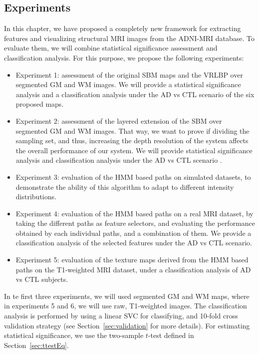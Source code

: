 \subsection{Experiments}
In this chapter, we have proposed a completely new framework for extracting features and visualizing structural \ac{MRI} images from the ADNI-MRI database. To evaluate them, we will combine statistical significance assessment and classification analysis. For this purpose, we propose the following experiments: 
\begin{itemize}
	\item Experiment 1: assessment of the original \ac{SBM} maps and the \ac{VRLBP} over segmented \ac{GM} and \ac{WM} images. We will provide a statistical significance analysis and a classification analysis under the \ac{AD} vs \ac{CTL} scenario of the six proposed maps. 
	\item Experiment 2: assessment of the layered extension of the \ac{SBM} over segmented \ac{GM} and \ac{WM} images. That way, we want to prove if dividing the sampling set, and thus, increasing the depth resolution of the system affects the overall performance of our system. We will provide statistical significance analysis and classification analysis under the \ac{AD} vs \ac{CTL} scenario . 
	\item Experiment 3: evaluation of the \ac{HMM} based paths on simulated datasets, to demonstrate the ability of this algorithm to adapt to different intensity distributions. 
	\item Experiment 4: evaluation of the \ac{HMM} based paths on a real \ac{MRI} dataset, by taking the different paths as feature selectors, and evaluating the performance obtained by each individual paths, and a combination of them. We provide a classification analysis of the selected features under the \ac{AD} vs \ac{CTL} scenario.
	\item Experiment 5: evaluation of the texture maps derived from the \ac{HMM} based paths on the T1-weighted \ac{MRI} dataset, under a classification analysis of \ac{AD} vs \ac{CTL} subjects. 
\end{itemize}

In te first three experiments, we will used segmented \ac{GM} and \ac{WM} maps, where in experiments 5 and 6, we will use raw, T1-weighted images. The classification analysis is performed by using a linear \ac{SVC} for classifying, and 10-fold cross validation strategy (see Section~\ref{sec:validation} for more details). For estimating statistical significance, we use the two-sample $t$-test defined in Section~\ref{sec:ttestEq}. 


